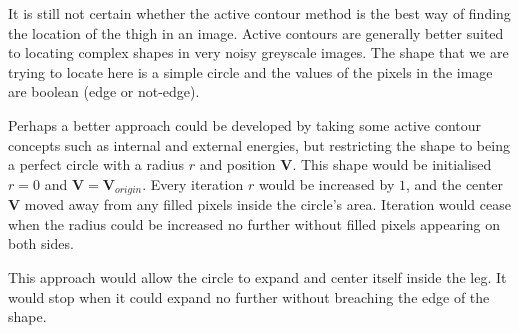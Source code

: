\bigskip
\noindent It is still not certain whether the active contour method is the best way of finding the location of the thigh in an image.
Active contours are generally better suited to locating complex shapes in very noisy greyscale images.
The shape that we are trying to locate here is a simple circle and the values of the pixels in the image are boolean (edge or not-edge).

Perhaps a better approach could be developed by taking some active contour concepts such as internal and external energies,
but restricting the shape to being a perfect circle with a radius $r$ and position $\mathbf{V}$.
This shape would be initialised $r = 0$ and $\mathbf{V} = \mathbf{V}_{origin}$.
Every iteration $r$ would be increased by $1$, and the center $\mathbf{V}$ moved away from any filled pixels inside the circle's area.
Iteration would cease when the radius could be increased no further without filled pixels appearing on both sides.

This approach would allow the circle to expand and center itself inside the leg.
It would stop when it could expand no further without breaching the edge of the shape.

